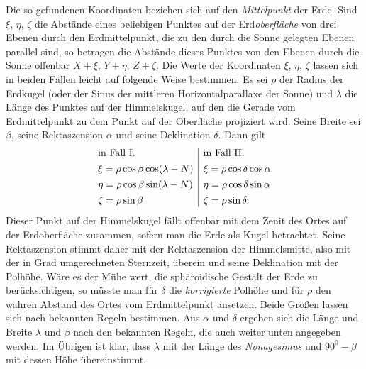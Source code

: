 Die so gefundenen Koordinaten beziehen sich auf den \textit{Mittelpunkt} der Erde. Sind $\xi$, $\eta$, $\zeta$ die Abstände eines beliebigen Punktes auf der Erd\textit{oberfläche} von drei Ebenen durch den Erdmittelpunkt, die zu den durch die Sonne gelegten Ebenen parallel sind, so betragen die Abstände dieses Punktes von den Ebenen durch die Sonne offenbar $X+\xi$, $Y+\eta$, $Z+\zeta$. Die Werte der Koordinaten $\xi$, $\eta$, $\zeta$ lassen sich in beiden Fällen leicht auf folgende Weise bestimmen. Es sei $\rho$ der Radius der Erdkugel (oder der Sinus der mittleren Horizontalparallaxe der Sonne) und $\lambda$ die Länge des Punktes auf der Himmelskugel, auf den die Gerade vom Erdmittelpunkt zu dem Punkt auf der Oberfläche projiziert wird. Seine Breite sei $\beta$, seine Rektaszension $\alpha$ und seine Deklination $\delta$. Dann gilt
\[
\begin{array}{@{}l|l@{}}
\text{in Fall I.}&\text{in Fall II.}\\[.4em]
\xi=\rho\cos\beta\cos(\lambda-N)&\xi=\rho\cos\delta\cos\alpha\\[.4em]
\eta=\rho\cos\beta\sin(\lambda-N)&\eta=\rho\cos\delta\sin\alpha\\[.4em]
\zeta=\rho\sin\beta&\zeta=\rho\sin\delta.
\end{array}
\]
Dieser Punkt auf der Himmelskugel fällt offenbar mit dem Zenit des Ortes auf der Erdoberfläche zusammen, sofern man die Erde als Kugel betrachtet. Seine Rektaszension stimmt daher mit der Rektaszension der Himmelsmitte, also mit der in Grad umgerechneten Sternzeit, überein und seine Deklination mit der Polhöhe. Wäre es der Mühe wert, die sphäroidische Gestalt der Erde zu berücksichtigen, so müsste man für $\delta$ die \textit{korrigierte} Polhöhe und für $\rho$ den wahren Abstand des Ortes vom Erdmittelpunkt ansetzen. Beide Größen lassen sich nach bekannten Regeln bestimmen. Aus $\alpha$ und $\delta$ ergeben sich die Länge und Breite $\lambda$ und $\beta$ nach den bekannten Regeln, die auch weiter unten angegeben werden. Im Übrigen ist klar, dass $\lambda$ mit der Länge des \textit{Nonagesimus} und $90^0-\beta$ mit dessen Höhe übereinstimmt.
